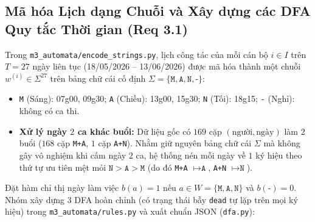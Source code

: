 \subsection{Mã hóa Lịch dạng Chuỗi và Xây dựng các DFA Quy tắc Thời gian (Req 3.1)}
\label{sec:m3_dfa}

Trong \texttt{m3\_\allowbreak automata/\allowbreak encode\_\allowbreak strings.py}, lịch công tác của mỗi cán bộ $i \in I$ trên $T = 27$ ngày liên tục (18/05/2026 -- 13/06/2026) được mã hóa thành một chuỗi $w^{(i)} \in \Sigma^{27}$ trên bảng chữ cái cố định $\Sigma = \{\texttt{M}, \texttt{A}, \texttt{N}, \texttt{-}\}$:
\begin{itemize}
    \item \texttt{M} (Sáng): 07g00, 09g30; \quad \texttt{A} (Chiều): 13g00, 15g30; \quad \texttt{N} (Tối): 18g15; \quad \texttt{-} (Nghỉ): không có ca thi.
    \item \textbf{Xử lý ngày $2$ ca khác buổi:} Dữ liệu gốc có $169$ cặp $(\text{người}, \text{ngày})$ làm $2$ buổi ($168$ cặp \texttt{M+A}, $1$ cặp \texttt{A+N}). Nhằm giữ nguyên bảng chữ cái $\Sigma$ mà không gây vô nghiệm khi cấm ngày $2$ ca, hệ thống nén mỗi ngày về $1$ ký hiệu theo thứ tự ưu tiên mệt mỏi $\texttt{N} > \texttt{A} > \texttt{M}$ (do đó \texttt{M+A} $\mapsto \texttt{A}$, \texttt{A+N} $\mapsto \texttt{N}$).
\end{itemize}

Đặt hàm chỉ thị ngày làm việc $b(a) = 1$ nếu $a \in W = \{\texttt{M}, \texttt{A}, \texttt{N}\}$ và $b(\texttt{-}) = 0$. Nhóm xây dựng $3$ DFA hoàn chỉnh (có trạng thái bẫy \texttt{dead} tự lặp trên mọi ký hiệu) trong \texttt{m3\_\allowbreak automata/\allowbreak rules.py} và xuất chuẩn JSON (\texttt{dfa.py}):

